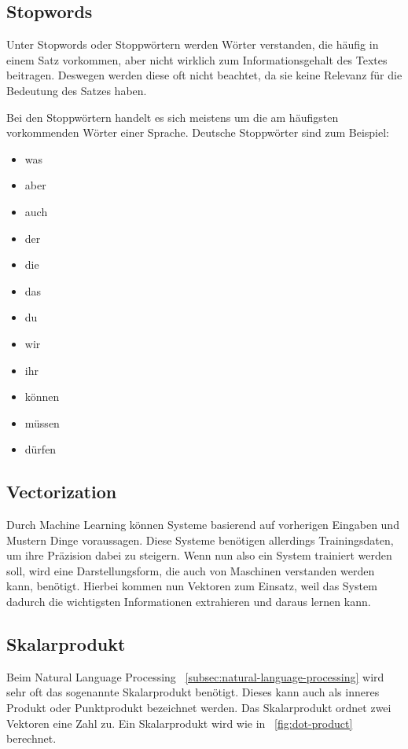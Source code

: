 \subsection{Stopwords}

Unter Stopwords oder Stoppwörtern werden Wörter verstanden, die häufig in einem Satz vorkommen, aber nicht wirklich zum Informationsgehalt des Textes beitragen.
Deswegen werden diese oft nicht beachtet, da sie keine Relevanz für die Bedeutung des Satzes haben.

Bei den Stoppwörtern handelt es sich meistens um die am häufigsten vorkommenden Wörter einer Sprache.
Deutsche Stoppwörter sind zum Beispiel:\cite{germanStopwords}

\begin{itemize}
    \item was
    \item aber
    \item auch
    \item der
    \item die
    \item das
    \item du
    \item wir
    \item ihr
    \item können
    \item müssen
    \item dürfen
\end{itemize}

\subsection{Vectorization}

Durch Machine Learning können Systeme basierend auf vorherigen Eingaben und Mustern Dinge voraussagen.
Diese Systeme benötigen allerdings Trainingsdaten, um ihre Präzision dabei zu steigern.
Wenn nun also ein System trainiert werden soll, wird eine Darstellungsform, die auch von Maschinen verstanden werden kann, benötigt.
Hierbei kommen nun Vektoren zum Einsatz, weil das System dadurch die wichtigsten Informationen extrahieren und daraus lernen kann.

\subsection{Skalarprodukt}

Beim Natural Language Processing ~\ref{subsec:natural-language-processing} wird sehr oft das sogenannte Skalarprodukt benötigt.
Dieses kann auch als inneres Produkt oder Punktprodukt bezeichnet werden.
Das Skalarprodukt ordnet zwei Vektoren eine Zahl zu.
Ein Skalarprodukt wird wie in ~\ref{fig:dot-product} berechnet.

